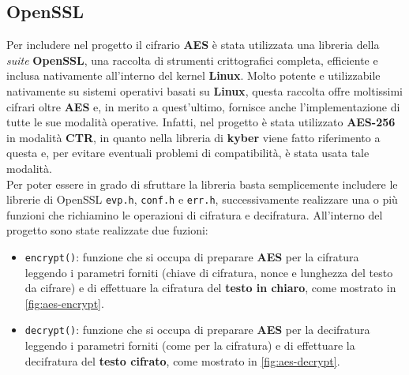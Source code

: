 \subsection{OpenSSL}
Per includere nel progetto il cifrario \textbf{AES} è stata utilizzata una libreria della \emph{suite} \textbf{OpenSSL}, una raccolta di strumenti crittografici completa, efficiente e inclusa nativamente all'interno del kernel \textbf{Linux}. Molto potente e utilizzabile nativamente su sistemi operativi basati su \textbf{Linux}, questa raccolta offre moltissimi cifrari oltre \textbf{AES} e, in merito a quest'ultimo, fornisce anche l'implementazione di tutte le sue modalità operative. Infatti, nel progetto è stata utilizzato \textbf{AES-256} in modalità \textbf{CTR}, in quanto nella libreria di \textbf{kyber} viene fatto riferimento a questa e, per evitare eventuali problemi di compatibilità, è stata usata tale modalità.\\
Per poter essere in grado di sfruttare la libreria basta semplicemente includere le librerie di OpenSSL \texttt{evp.h}, \texttt{conf.h} e \texttt{err.h}, successivamente realizzare una o più funzioni che richiamino le operazioni di cifratura e decifratura. All'interno del progetto sono state realizzate due fuzioni:
\begin{itemize}
    \item \texttt{encrypt()}: funzione che si occupa di preparare \textbf{AES} per la cifratura leggendo i parametri forniti (chiave di cifratura, nonce e lunghezza del testo da cifrare) e di effettuare la cifratura del \textbf{testo in chiaro}, come mostrato in \autoref{fig:aes-encrypt}.
    \item \texttt{decrypt()}: funzione che si occupa di preparare \textbf{AES} per la decifratura leggendo i parametri forniti (come per la cifratura) e di effettuare la decifratura del \textbf{testo cifrato}, come mostrato in \autoref{fig:aes-decrypt}.
\end{itemize}


